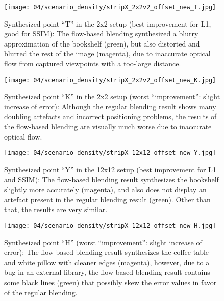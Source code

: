 \begin{figure}
  \centering
  \texttt{[image: 04/scenario\_density/stripX\_2x2v2\_offset\_new\_T.jpg]}
  \caption[Viewpoint ``T'' in the 2x2 setup]{Synthesized point ``T'' in the 2x2 setup (best improvement for L1, good for SSIM): The flow-based blending synthesized a blurry approximation of the bookshelf (green), but also distorted and blurred the rest of the image (magenta), due to inaccurate optical flow from captured viewpoints with a too-large distance.}
  \label{fig:dens_2x2_T}
\end{figure}

\begin{figure}
  \centering
  \texttt{[image: 04/scenario\_density/stripX\_2x2v2\_offset\_new\_K.jpg]}
  \caption[Viewpoint ``K'' in the 2x2 setup]{Synthesized point ``K'' in the 2x2 setup (worst ``improvement'': slight increase of error): Although the regular blending result shows many doubling artefacts and incorrect positioning problems, the results of the flow-based blending are visually much worse due to inaccurate optical flow.}
  \label{fig:dens_2x2_K}
\end{figure}

\begin{figure}
  \centering
  \texttt{[image: 04/scenario\_density/stripX\_12x12\_offset\_new\_Y.jpg]}
  \caption[Viewpoint ``Y'' in the 12x12 setup]{Synthesized point ``Y'' in the 12x12 setup (best improvement for L1 and SSIM): The flow-based blending result synthesizes the bookshelf slightly more accurately (magenta), and also does not display an artefact present in the regular blending result (green). Other than that, the results are very similar.}
  \label{fig:dens_12x12_Y}
\end{figure}

\begin{figure}
  \centering
  \texttt{[image: 04/scenario\_density/stripX\_12x12\_offset\_new\_H.jpg]}
  \caption[Viewpoint ``H'' in the 12x12 setup]{Synthesized point ``H'' (worst ``improvement'': slight increase of error): The flow-based blending result synthesizes the coffee table and white pillow with cleaner edges (magenta), however, due to a bug in an external library, the flow-based blending result contains some black lines (green) that possibly skew the error values in favor of the regular blending.}
  \label{fig:dens_12x12_H}
\end{figure}


